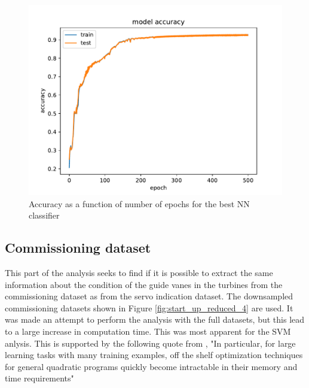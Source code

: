             \begin{figure}
                \centering
                \includegraphics[scale = 0.6]{figures/analysis/nn/model_accuarcy_NN_500_10000_h5_d3.pdf}
                \caption{Accuracy as a function of number of epochs for the best NN classifier}
                \label{fig:model_accuracy_nn}
            \end{figure}
        
        \clearpage
    \subsection{Commissioning dataset}
        This part of the analysis seeks to find if it is possible to extract the same information about the condition of the guide vanes in the turbines from the commissioning dataset as from the servo indication dataset. The downsampled commissioning datasets shown in Figure \ref{fig:start_up_reduced_4} are used. It was made an attempt to perform the analysis with the full datasets, but this lead to a large increase in computation time. This was most apparent for the SVM anlysis. This is supported by the following quote from \cite{Joachims1998}, "In particular, for large learning tasks with many training examples, off the shelf optimization techniques for general quadratic programs quickly become intractable in their memory and time requirements"
